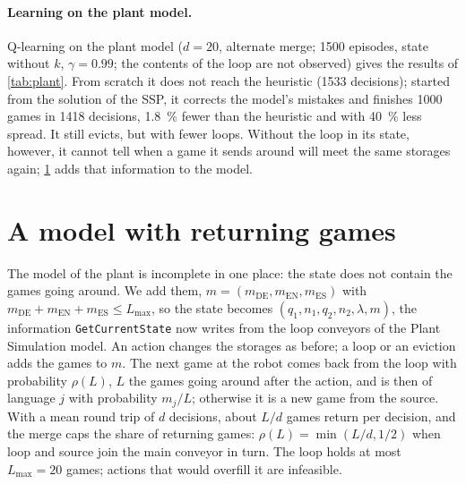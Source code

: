 \documentclass[11pt,a4paper]{article}
\begin{document}
\paragraph{Learning on the plant model.} Q-learning on the plant model ($d = 20$, alternate merge; 1500 episodes,
state without $k$, $\gamma = 0.99$; the contents of the loop are not observed) gives the results of
\cref{tab:plant}. From scratch it does not reach the heuristic (1533 decisions); started from the solution of the
SSP, it corrects the model's mistakes and finishes 1000 games in 1418 decisions, \SI{1.8}{\percent} fewer than the
heuristic and with \SI{40}{\percent} less spread. It still evicts, but with fewer loops. Without the loop in its
state, however, it cannot tell when a game it sends around will meet the same storages again; \cref{sec:return} adds
that information to the model.

\begin{table}[H]
  \centering\small
  \caption{Policies on the plant model with returning games ($d = 20$, alternate merge; 30 episodes, mean $\pm$
    standard deviation).}
  \label{tab:plant}
  
\end{table}

\section{A model with returning games}\label{sec:return}

The model of the plant is incomplete in one place: the state does not contain the games going around. We add them,
$m = (m_\text{DE}, m_\text{EN}, m_\text{ES})$ with $m_\text{DE} + m_\text{EN} + m_\text{ES} \le L_\text{max}$, so the
state becomes $(q_1, n_1, q_2, n_2, \lambda, m)$, the information \texttt{GetCurrentState} now writes from the loop
conveyors of the Plant Simulation model. An action changes the storages as before; a loop or an eviction adds the
games to $m$. The next game at the robot comes back from the loop with probability $\rho(L)$, $L$ the games going
around after the action, and is then of language $j$ with probability $m_j / L$; otherwise it is a new game from
the source. With a mean round trip of $d$ decisions, about $L/d$ games return per decision, and the merge caps the
share of returning games: $\rho(L) = \min(L/d, 1/2)$ when loop and source join the main conveyor in turn. The loop
holds at most $L_\text{max} = 20$ games; actions that would overfill it are infeasible.
\end{document}
